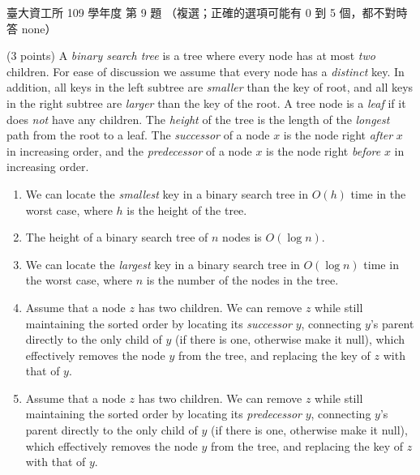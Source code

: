 \begin{pastexam}[label={px:ntu-109-dsaa-09}]{臺大資工所 109 學年度 第 9 題}
（複選；正確的選項可能有 0 到 5 個，都不對時答 none）

(3 points) A \textit{binary search tree} is a tree where every node has at most \textit{two}
children. For ease of discussion we assume that every node has a \textit{distinct} key. In
addition, all keys in the left subtree are \textit{smaller} than the key of root, and all keys in
the right subtree are \textit{larger} than the key of the root. A tree node is a \textit{leaf} if
it does \textit{not} have any children. The \textit{height} of the tree is the length of the
\textit{longest} path from the root to a leaf. The \textit{successor} of a node $x$ is the node
right \textit{after} $x$ in increasing order, and the \textit{predecessor} of a node $x$ is the
node right \textit{before} $x$ in increasing order.
\begin{enumerate}[label=\arabic*.]
\item We can locate the \textit{smallest} key in a binary search tree in $O(h)$ time in the
worst case, where $h$ is the height of the tree.
\item The height of a binary search tree of $n$ nodes is $O(\log n)$.
\item We can locate the \textit{largest} key in a binary search tree in $O(\log n)$ time in the
worst case, where $n$ is the number of the nodes in the tree.
\item Assume that a node $z$ has two children. We can remove $z$ while still maintaining the
sorted order by locating its \textit{successor} $y$, connecting $y$'s parent directly to the only
child of $y$ (if there is one, otherwise make it null), which effectively removes the node $y$
from the tree, and replacing the key of $z$ with that of $y$.
\item Assume that a node $z$ has two children. We can remove $z$ while still maintaining the
sorted order by locating its \textit{predecessor} $y$, connecting $y$'s parent directly to the
only child of $y$ (if there is one, otherwise make it null), which effectively removes the node
$y$ from the tree, and replacing the key of $z$ with that of $y$.
\end{enumerate}
\end{pastexam}

